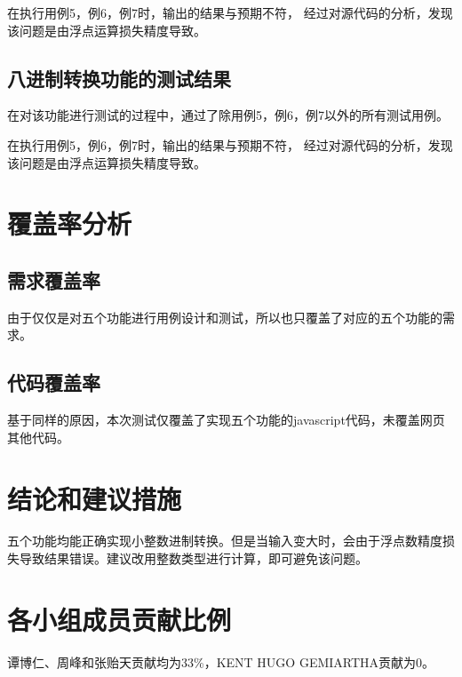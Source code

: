 \documentclass[12pt, a4paper, oneside]{ctexart}
\begin{document}
在执行用例5，例6，例7时，输出的结果与预期不符，
经过对源代码的分析，发现该问题是由浮点运算损失精度导致。

\subsection{八进制转换功能的测试结果}
在对该功能进行测试的过程中，通过了除用例5，例6，例7以外的所有测试用例。

在执行用例5，例6，例7时，输出的结果与预期不符，
经过对源代码的分析，发现该问题是由浮点运算损失精度导致。

\section{覆盖率分析}
\subsection{需求覆盖率}
由于仅仅是对五个功能进行用例设计和测试，所以也只覆盖了对应的五个功能的需求。

\subsection{代码覆盖率}
基于同样的原因，本次测试仅覆盖了实现五个功能的javascript代码，未覆盖网页其他代码。

\section{结论和建议措施}
五个功能均能正确实现小整数进制转换。但是当输入变大时，会由于浮点数精度损失导致结果错误。建议改用整数类型进行计算，即可避免该问题。

\section{各小组成员贡献比例}
谭博仁、周峰和张贻天贡献均为33\%，KENT HUGO GEMIARTHA贡献为0。
\end{document}
